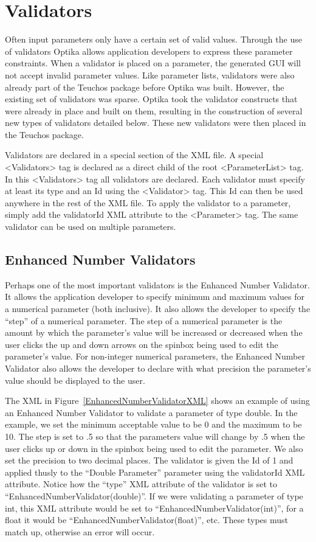 \section{Validators}
Often input parameters only have a certain set of valid values. Through the use of validators Optika allows application
developers to express these parameter constraints. When a validator is placed on a parameter, the generated GUI will
not accept invalid parameter values. Like parameter lists, validators were also already part of the Teuchos package
before Optika was built. However, the existing set of validators was sparse. Optika took the validator constructs that
were already in place and built on them, resulting in the construction of several new types of validators detailed below.
These new validators were then placed in the Teuchos package.

Validators are declared in a special section of the XML file. A special <Validators> tag is declared as a direct child
of the root <ParameterList> tag. In this <Validators> tag all validators are declared. Each validator must specify at
least its type and an Id using the <Validator> tag. This Id can then be used anywhere in the rest of the XML file. 
To apply the validator to a parameter, simply add the validatorId XML attribute to the <Parameter> tag. The same validator 
can be used on multiple parameters.

\subsection{Enhanced Number Validators}
Perhaps one of the most important validators is the Enhanced Number Validator. It allows the application developer
to specify minimum and maximum values for a numerical parameter (both inclusive). It also allows the developer to specify the
``step'' of a numerical parameter. The step of a numerical parameter is the amount by which the parameter's value
will be increased or decreased when the user clicks the up and down arrows on the spinbox being used to edit
the parameter's value. For non-integer numerical parameters, the Enhanced Number Validator also allows the
developer to declare with what precision the parameter's value should be displayed to the user.

The XML in Figure~\ref{EnhancedNumberValidatorXML} shows an example of using an Enhanced Number Validator
to validate a parameter of type double. In the example, we set the minimum acceptable value to be 0 and the 
maximum to be 10. The step is set to .5 so that the parameters value will change by .5 when the user clicks
up or down in the spinbox being used to edit the parameter. We also set the precision to two decimal places.
The validator is given the Id of 1 and applied thusly to the ``Double Parameter'' parameter using the validatorId
XML attribute. Notice how the ``type'' XML attribute of the validator is set to ``EnhancedNumberValidator(double)''. If we 
were validating a parameter of type int, this XML attribute would be set to ``EnhancedNumberValidator(int)'', 
for a float it would be ``EnhancedNumberValidator(float)'', etc. These types must match up, otherwise an error will
occur.

